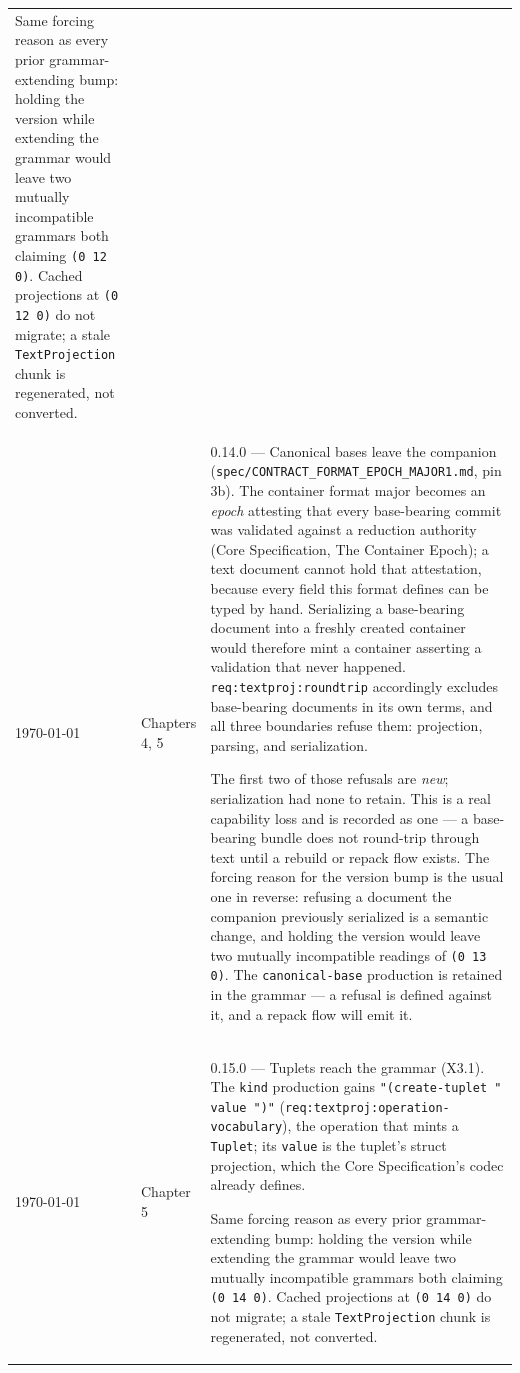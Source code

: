 \documentclass[11pt,letterpaper]{report}
\newcommand{\sectionsc}[1]{{\addfontfeatures{Letters=SmallCaps}#1}}
\begin{document}
\begin{longtable}{p{2cm} p{2.5cm} p{9cm}}
  Same forcing reason as every prior grammar-extending bump: holding the
  version while extending the grammar would leave two mutually incompatible
  grammars both claiming \texttt{(0 12 0)}. Cached projections at
  \texttt{(0 12 0)} do not migrate; a stale \texttt{TextProjection} chunk is
  regenerated, not converted. \\

    \today & Chapters 4, 5 & 0.14.0 --- Canonical bases leave the companion
  (\texttt{spec/CONTRACT\_FORMAT\_EPOCH\_MAJOR1.md}, pin 3b). The container
  format major becomes an \emph{epoch} attesting that every base-bearing commit
  was validated against a reduction authority (Core Specification,
  \sectionsc{The Container Epoch}); a text document cannot hold that attestation,
  because every field this format defines can be typed by hand. Serializing a
  base-bearing document into a freshly created container would therefore mint a
  container asserting a validation that never happened.
  \texttt{req:textproj:roundtrip} accordingly excludes base-bearing documents in
  its own terms, and all three boundaries refuse them: projection, parsing, and
  serialization.

  The first two of those refusals are \emph{new}; serialization had none to
  retain. This is a real capability loss and is recorded as one --- a
  base-bearing bundle does not round-trip through text until a rebuild or repack
  flow exists. The forcing reason for the version bump is the usual one in
  reverse: refusing a document the companion previously serialized is a semantic
  change, and holding the version would leave two mutually incompatible readings
  of \texttt{(0 13 0)}. The \texttt{canonical-base} production is retained in the
  grammar --- a refusal is defined against it, and a repack flow will emit it. \\

    \today & Chapter 5 & 0.15.0 --- Tuplets reach the grammar (X3.1). The
  \texttt{kind} production gains \texttt{"(create-tuplet " value ")"}
  (\texttt{req:textproj:operation-vocabulary}), the operation that mints a
  \texttt{Tuplet}; its \texttt{value} is the tuplet's struct projection, which
  the Core Specification's codec already defines.

  Same forcing reason as every prior grammar-extending bump: holding the
  version while extending the grammar would leave two mutually incompatible
  grammars both claiming \texttt{(0 14 0)}. Cached projections at
  \texttt{(0 14 0)} do not migrate; a stale \texttt{TextProjection} chunk is
  regenerated, not converted. \\


\end{longtable}
\end{document}

